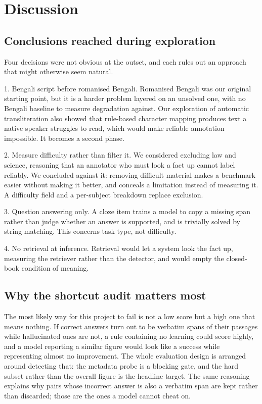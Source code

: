 \documentclass[12pt,a4paper]{article}
\begin{document}
\section{Discussion}
\label{sec:discussion}

\subsection{Conclusions reached during exploration}

Four decisions were not obvious at the outset, and each rules out an approach
that might otherwise seem natural.

1. Bengali script before romanised Bengali. Romanised Bengali was our original
starting point, but it is a harder problem layered on an unsolved one, with no
Bengali baseline to measure degradation against. Our exploration of automatic
transliteration also showed that rule-based character mapping produces text a
native speaker struggles to read, which would make reliable annotation
impossible. It becomes a second phase.

2. Measure difficulty rather than filter it. We considered excluding law and
science, reasoning that an annotator who must look a fact up cannot label
reliably. We concluded against it: removing difficult material makes a benchmark
easier without making it better, and conceals a limitation instead of measuring
it. A difficulty field and a per-subject breakdown replace exclusion.

3. Question answering only. A cloze item trains a model to copy a missing span
rather than judge whether an answer is supported, and is trivially solved by
string matching. This concerns task type, not difficulty.

4. No retrieval at inference. Retrieval would let a system look the fact up,
measuring the retriever rather than the detector, and would empty the
closed-book condition of meaning.

\subsection{Why the shortcut audit matters most}

The most likely way for this project to fail is not a low score but a high one
that means nothing. If correct answers turn out to be verbatim spans of their
passages while hallucinated ones are not, a rule containing no learning could
score highly, and a model reporting a similar figure would look like a success
while representing almost no improvement. The whole evaluation design is
arranged around detecting that: the metadata probe is a blocking gate, and the
hard subset rather than the overall figure is the headline target. The same
reasoning explains why pairs whose incorrect answer is also a verbatim span are
kept rather than discarded; those are the ones a model cannot cheat on.
\end{document}
